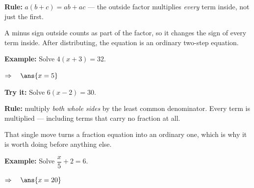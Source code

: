 \documentclass[12pt]{article}
\begin{document}


\begin{formulabox}
\textbf{Rule:} \quad $a(b + c) = ab + ac$ \quad --- the outside factor multiplies
\emph{every} term inside, not just the first.
\par\smallskip
A minus sign outside counts as part of the factor, so it changes the sign of every term
inside. After distributing, the equation is an ordinary two-step equation.
\end{formulabox}

\begin{examplebox}
\textbf{Example:} \quad Solve $4(x + 3) = 32$.

$\Rightarrow\quad \ans{x = 5}$
\end{examplebox}

\begin{tryitbox}
\textbf{Try it:} \quad Solve $6(x - 2) = 30$.\\[2pt]
\end{tryitbox}


\begin{formulabox}
\textbf{Rule:} multiply \emph{both whole sides} by the least common denominator. Every
term is multiplied --- including terms that carry no fraction at all.
\par\smallskip
That single move turns a fraction equation into an ordinary one, which is why it is worth
doing before anything else.
\end{formulabox}

\begin{examplebox}
\textbf{Example:} \quad Solve $\dfrac{x}{5} + 2 = 6$.

$\Rightarrow\quad \ans{x = 20}$
\end{examplebox}
\end{document}
